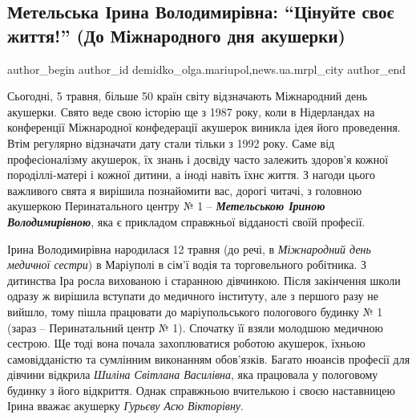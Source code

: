  
 
 
 
 
 
\subsection{Метельська Ірина Володимирівна: \enquote{Цінуйте своє життя!} (До Міжнародного дня акушерки)}
\label{sec:05_05_2020.stz.news.ua.mrpl_city.1.metelska_iryna_volodymyrivna}
 
\ifcmt
 author_begin
   author_id demidko_olga.mariupol,news.ua.mrpl_city
 author_end
\fi

Сьогодні, 5 травня, більше 50 країн світу відзначають Міжнародний день
акушерки. Свято веде свою історію ще з 1987 року, коли в Нідерландах на
конференції Міжнародної конфедерації акушерок виникла ідея його проведення.
Втім регулярно відзначати дату стали тільки з 1992 року. Саме від
професіоналізму акушерок, їх знань і досвіду часто залежить здоров'я кожної
породіллі-матері і кожної дитини, а іноді навіть їхнє життя. З нагоди цього
важливого свята я вирішила познайомити вас, дорогі читачі, з головною акушеркою
Перинатального центру № 1 – \emph{\textbf{Метельською Іриною Володимирівною}}, яка є прикладом
справжньої відданості своїй професії.


Ірина Володимирівна народилася 12 травня (до речі, в \emph{Міжнародний день медичної
сестри}) в Маріуполі в сім'ї водія та торговельного робітника. З дитинства Іра
росла вихованою і старанною дівчинкою. Після закінчення школи одразу ж вирішила
вступати до медичного інституту, але з першого разу не вийшло, тому пішла
працювати до маріупольського пологового будинку № 1 (зараз – Перинатальний
центр № 1). Спочатку її взяли молодшою медичною сестрою. Ще тоді вона почала
захоплюватися роботою акушерок, їхньою самовідданістю та сумлінним виконанням
обов'язків. Багато нюансів професії для дівчини відкрила \emph{Шиліна Світлана
Василівна}, яка працювала у пологовому будинку з його відкриття. Однак
справжньою вчителькою і своєю наставницею Ірина вважає акушерку \emph{Гурьєву Асю
Вікторівну}.

